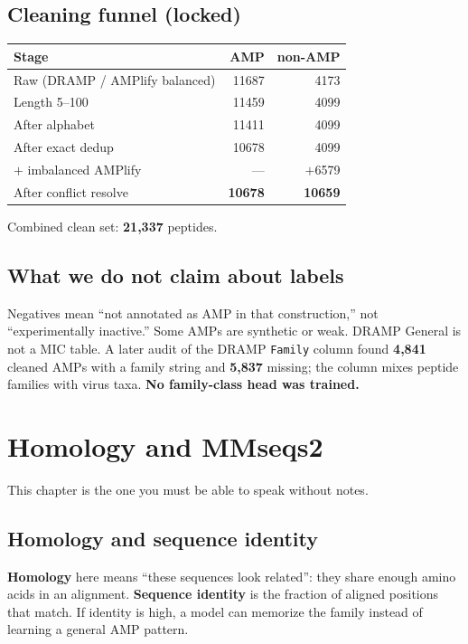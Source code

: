 \documentclass[11pt,a4paper]{report}
\begin{document}
\section{Cleaning funnel (locked)}

\begin{tabular}{lrr}
\toprule
Stage & AMP & non-AMP \\
\midrule
Raw (DRAMP / AMPlify balanced) & 11687 & 4173 \\
Length 5--100 & 11459 & 4099 \\
After alphabet & 11411 & 4099 \\
After exact dedup & 10678 & 4099 \\
$+$ imbalanced AMPlify & --- & $+$6579 \\
After conflict resolve & \textbf{10678} & \textbf{10659} \\
\bottomrule
\end{tabular}

Combined clean set: \textbf{21{,}337} peptides.

\section{What we do not claim about labels}

Negatives mean ``not annotated as AMP in that construction,'' not ``experimentally inactive.'' Some AMPs are synthetic or weak. DRAMP General is not a MIC table. A later audit of the DRAMP \texttt{Family} column found \textbf{4{,}841} cleaned AMPs with a family string and \textbf{5{,}837} missing; the column mixes peptide families with virus taxa. \textbf{No family-class head was trained.}

\chapter{Homology and MMseqs2}
\label{ch:homology}

This chapter is the one you must be able to speak without notes.

\section{Homology and sequence identity}

\textbf{Homology} here means ``these sequences look related'': they share enough amino acids in an alignment. \textbf{Sequence identity} is the fraction of aligned positions that match. If identity is high, a model can memorize the family instead of learning a general AMP pattern.
\end{document}
